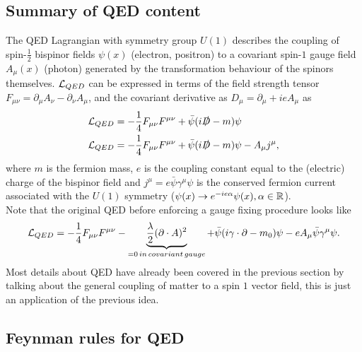 \subsection{Summary of QED content}
The QED Lagrangian with symmetry group $U(1)$ describes the coupling of spin-$\frac{1}{2}$ bispinor fields $\psi(x)$ (electron, positron) to a covariant spin-$1$ gauge field $A_{\mu}(x)$ (photon) generated by the transformation behaviour of the spinors themselves. $\mathcal{L}_{QED}$ can be expressed in terms of the field strength tensor $F_{\mu \nu} = \partial_{\mu} A_{\nu} - \partial_{\nu} A_{\mu}$, and the covariant derivative as $D_{\mu} = \partial_{\mu} + i e A_{\mu}$ as
\begin{align}
	\mathcal{L}_{QED} &= - \frac{1}{4} F_{\mu \nu} F^{\mu \nu} + \bar{\psi} (i \slashed{D} - m) \psi \\
	\mathcal{L}_{QED} &= - \frac{1}{4} F_{\mu \nu} F^{\mu \nu}+ \bar{\psi} (i \slashed{D} -m) \psi - A_{\mu}j^{\mu},
\end{align}
where $m$ is the fermion mass, $e$ is the coupling constant equal to the (electric) charge of the bispinor field and $j^{\mu} = e \bar{\psi} \gamma^{\mu} \psi$ is the conserved fermion current associated with the $U(1)$ symmetry ($\psi(x) \rightarrow e^{- i e \alpha} \psi(x), \alpha \in \mathbb{R}$).\\
Note that the original QED before enforcing a gauge fixing procedure looks like
\begin{equation}
\mathcal{L}_{QED} = -\frac{1}{4} F_{\mu \nu} F^{\mu \nu} - \underbrace{\frac{\lambda}{2} (\partial \cdot A)^2}_{=0 \, in \, covariant \, gauge} + \bar{\psi} (i \gamma\cdot \partial -m_0) \psi - e A_{\mu} \bar{\psi} \gamma^{\mu} \psi.
\end{equation}
Most details about QED have already been covered in the previous section by talking about the general coupling of matter to a spin $1$ vector field, this is just an application of the previous idea.

\subsection{Feynman rules for QED}

